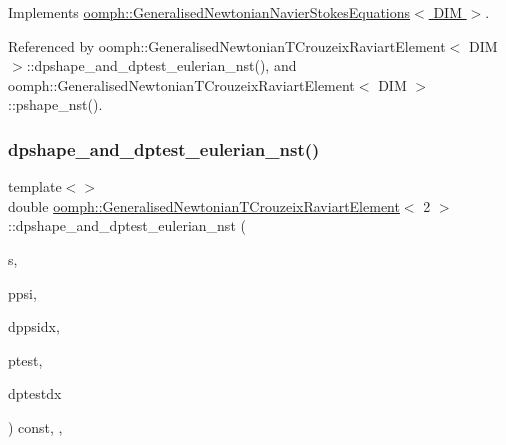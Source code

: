 Implements \hyperlink{classoomph_1_1GeneralisedNewtonianNavierStokesEquations_a00027d27dfdf3c0b72b0d1df9addfdc8}{oomph\+::\+Generalised\+Newtonian\+Navier\+Stokes\+Equations$<$ D\+I\+M $>$}.



Referenced by oomph\+::\+Generalised\+Newtonian\+T\+Crouzeix\+Raviart\+Element$<$ D\+I\+M $>$\+::dpshape\+\_\+and\+\_\+dptest\+\_\+eulerian\+\_\+nst(), and oomph\+::\+Generalised\+Newtonian\+T\+Crouzeix\+Raviart\+Element$<$ D\+I\+M $>$\+::pshape\+\_\+nst().

\mbox{\label{classoomph_1_1GeneralisedNewtonianTCrouzeixRaviartElement_a8e7f3bf308bd4837cb0326706211de65}} 
\subsubsection{\texorpdfstring{dpshape\+\_\+and\+\_\+dptest\+\_\+eulerian\+\_\+nst()}{dpshape\_and\_dptest\_eulerian\_nst()}\hspace{0.1cm}{\footnotesize\ttfamily [2/3]}}
{\footnotesize\ttfamily template$<$$>$ \\
double \hyperlink{classoomph_1_1GeneralisedNewtonianTCrouzeixRaviartElement}{oomph\+::\+Generalised\+Newtonian\+T\+Crouzeix\+Raviart\+Element}$<$ 2 $>$\+::dpshape\+\_\+and\+\_\+dptest\+\_\+eulerian\+\_\+nst (\begin{DoxyParamCaption}\item[{const \hyperlink{classoomph_1_1Vector}{Vector}$<$ double $>$ \&}]{s,  }\item[{\hyperlink{classoomph_1_1Shape}{Shape} \&}]{ppsi,  }\item[{\hyperlink{classoomph_1_1DShape}{D\+Shape} \&}]{dppsidx,  }\item[{\hyperlink{classoomph_1_1Shape}{Shape} \&}]{ptest,  }\item[{\hyperlink{classoomph_1_1DShape}{D\+Shape} \&}]{dptestdx }\end{DoxyParamCaption}) const\hspace{0.3cm}{\ttfamily [inline]}, {\ttfamily [protected]}, {\ttfamily [virtual]}}

